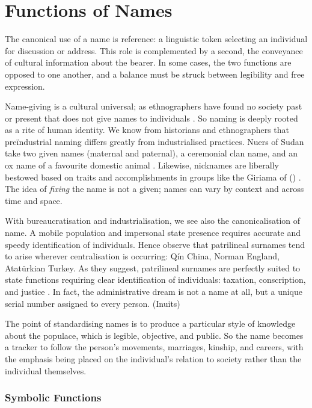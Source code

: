 \section{Functions of Names}

The canonical use of a name is reference: a linguistic token selecting an individual for discussion or address. This role is complemented by a second, the conveyance of cultural information about the bearer. In some cases, the two functions are opposed to one another, and a balance must be struck between legibility and free expression.

Name-giving is a cultural universal; as ethnographers have found no society past or present that does not give names to individuals \parencite{alford87}. So naming is deeply rooted as a rite of human identity. We know from historians and ethnographers that preïndustrial naming differs greatly from industrialised practices. Nuers of Sudan take two given names (maternal and paternal), a ceremonial clan name, and an ox name of a favourite domestic animal \parencite{wardhaugh92}. Likewise, nicknames are liberally bestowed based on traits and accomplishments in groups like the Giriama of () \parencite{}. The idea of \textit{fixing} the name is not a given; names can vary by context and across time and space.

With bureaucratisation and industrialisation, we see also the canonicalisation of name. A mobile population and impersonal state presence requires accurate and speedy identification of individuals. Hence \textcite{scott02} observe that patrilineal surnames tend to arise wherever centralisation is occurring: Qín China, Norman England, Atatürkian Turkey. As they suggest, patrilineal surnames are perfectly suited to state functions requiring clear identification of individuals: taxation, conscription, and justice \parencite[18]{scott02}. In fact, the administrative dream is not a name at all, but a unique serial number assigned to every person. (Inuits)

The point of standardising names is to produce a particular style of knowledge about the populace, which is legible, objective, and public. So the name becomes a tracker to follow the person's movements, marriages, kinship, and careers, with the emphasis being placed on the individual's relation to society rather than the individual themselves.

\subsubsection{Symbolic Functions}

